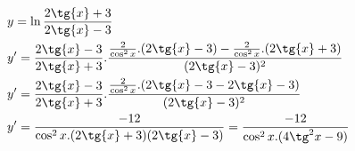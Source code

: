 \begin{ex}
\begin{align}
&y=\ln{\frac{2\tg{x}+3}{2\tg{x}-3}}\nonumber\\
&y'=\frac{2\tg{x}-3}{2\tg{x}+3}.\frac{\frac{2}{\cos^2{x}}.(2\tg{x}-3)-\frac{2}{\cos^2{x}}.(2\tg{x}+3)}{(2\tg{x}-3)^2}\nonumber\\
&y'=\frac{2\tg{x}-3}{2\tg{x}+3}.\frac{\frac{2}{\cos^2{x}}.(2\tg{x}-3-2\tg{x}-3)}{(2\tg{x}-3)^2}\nonumber\\
&y'=\frac{-12}{\cos^2{x}.(2\tg{x}+3)(2\tg{x}-3)}=\frac{-12}{\cos^2{x}.(4\tg^2{x}-9)}\nonumber
\end{align}
\end{ex}